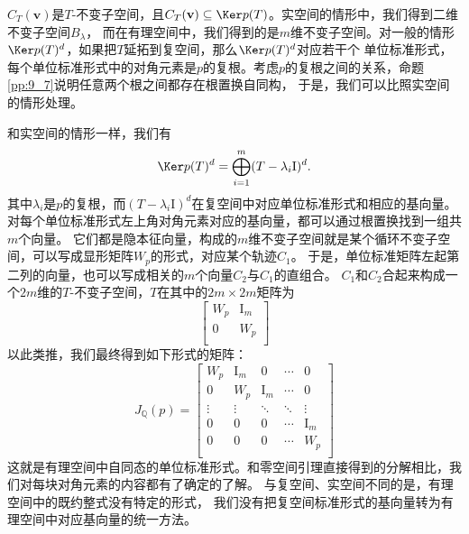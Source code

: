 \documentclass[12pt,UTF8]{ctexbook}
\begin{document}
$C_T(\mathbf{v})$是$T$-不变子空间，且$C_T(\mathbf{v})\subseteq\Ker p(T)$。实空间的情形中，我们得到二维不变子空间$B_\lambda$，
而在有理空间中，我们得到的是$m$维不变子空间。对一般的情形$\Ker p(T)^{d}$，如果把$T$延拓到复空间，那么$\Ker p(T)^{d}$对应若干个
单位标准形式，每个单位标准形式中的对角元素是$p$的复根。考虑$p$的复根之间的关系，命题\ref{pp:9_7}说明任意两个根之间都存在根置换自同构，
于是，我们可以比照实空间的情形处理。

和实空间的情形一样，我们有
$$\Ker p(T)^{d} = \bigoplus_{i=1}^m (T - \lambda_i \mathrm{I})^d. $$
其中$\lambda_i$是$p$的复根，而$(T - \lambda_i \mathrm{I})^d$在复空间中对应单位标准形式和相应的基向量。
对每个单位标准形式左上角对角元素对应的基向量，都可以通过根置换找到一组共$m$个向量。
它们都是隐本征向量，构成的$m$维不变子空间就是某个循环不变子空间，可以写成显形矩阵$W_p$的形式，对应某个轨迹$C_1$。
于是，单位标准矩阵左起第二列的向量，也可以写成相关的$m$个向量$C_2$与$C_1$的直组合。
$C_1$和$C_2$合起来构成一个$2m$维的$T$-不变子空间，$T$在其中的$2m\times 2m$矩阵为
$$ \begin{bmatrix}
    W_p & \mathrm{I}_m \\
    0 & W_p \\
   \end{bmatrix} $$
以此类推，我们最终得到如下形式的矩阵：
$$ J_\mathbb{Q}(p) = \begin{bmatrix}
    W_p & \mathrm{I}_m & 0 & \cdots & 0 \\
    0 & W_p & \mathrm{I}_m & \cdots & 0 \\
    \vdots & \vdots & \ddots & \ddots & \vdots  \\
    0 & 0 & 0 & \cdots & \mathrm{I}_m  \\
    0 & 0 & 0 & \cdots & W_p \\
   \end{bmatrix} $$
这就是有理空间中自同态的单位标准形式。和零空间引理直接得到的分解相比，我们对每块对角元素的内容都有了确定的了解。
与复空间、实空间不同的是，有理空间中的既约整式没有特定的形式，
我们没有把复空间标准形式的基向量转为有理空间中对应基向量的统一方法。


\end{document}
